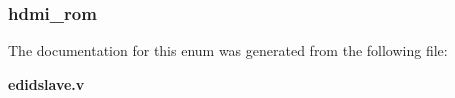 \subsubsection[{hdmirom}]{ {\bfseries \textcolor{vhdlchar}{hdmi\-\_\-rom}\textcolor{vhdlchar}{ }} \hspace{0.3cm}}\label{enum1edidslave_af278754aed34e68fec9ae68092a858c2}


The documentation for this enum was generated from the following file\-:\begin{DoxyCompactItemize}
\item 
{\bf edidslave.\-v}\end{DoxyCompactItemize}
